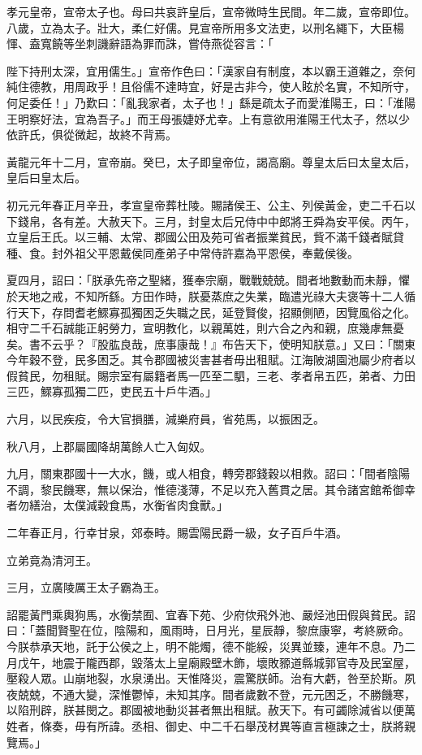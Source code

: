 
\begin{pinyinscope}
孝元皇帝，宣帝太子也。母曰共哀許皇后，宣帝微時生民間。年二歲，宣帝即位。八歲，立為太子。壯大，柔仁好儒。見宣帝所用多文法吏，以刑名繩下，大臣楊惲、盍寬饒等坐刺譏辭語為罪而誅，嘗侍燕從容言：「

陛下持刑太深，宜用儒生。」宣帝作色曰：「漢家自有制度，本以霸王道雜之，奈何純住德教，用周政乎！且俗儒不達時宜，好是古非今，使人眩於名實，不知所守，何足委任！」乃歎曰：「亂我家者，太子也！」繇是疏太子而愛淮陽王，曰：「淮陽王明察好法，宜為吾子。」而王母張婕妤尤幸。上有意欲用淮陽王代太子，然以少依許氏，俱從微起，故終不背焉。

黃龍元年十二月，宣帝崩。癸巳，太子即皇帝位，謁高廟。尊皇太后曰太皇太后，皇后曰皇太后。

初元元年春正月辛丑，孝宣皇帝葬杜陵。賜諸侯王、公主、列侯黃金，吏二千石以下錢帛，各有差。大赦天下。三月，封皇太后兄侍中中郎將王舜為安平侯。丙午，立皇后王氏。以三輔、太常、郡國公田及苑可省者振業貧民，貲不滿千錢者賦貸種、食。封外祖父平恩戴侯同產弟子中常侍許嘉為平恩侯，奉戴侯後。

夏四月，詔曰：「朕承先帝之聖緒，獲奉宗廟，戰戰兢兢。間者地數動而未靜，懼於天地之戒，不知所繇。方田作時，朕憂蒸庶之失業，臨遣光祿大夫褒等十二人循行天下，存問耆老鰥寡孤獨困乏失職之民，延登賢俊，招顯側陋，因覽風俗之化。相守二千石誠能正躬勞力，宣明教化，以親萬姓，則六合之內和親，庶幾虖無憂矣。書不云乎？『股肱良哉，庶事康哉！』布告天下，使明知朕意。」又曰：「關東今年穀不登，民多困乏。其令郡國被災害甚者毋出租賦。江海陂湖園池屬少府者以假貧民，勿租賦。賜宗室有屬籍者馬一匹至二駟，三老、孝者帛五匹，弟者、力田三匹，鰥寡孤獨二匹，吏民五十戶牛酒。」

六月，以民疾疫，令大官損膳，減樂府員，省苑馬，以振困乏。

秋八月，上郡屬國降胡萬餘人亡入匈奴。

九月，關東郡國十一大水，饑，或人相食，轉旁郡錢穀以相救。詔曰：「間者陰陽不調，黎民饑寒，無以保治，惟德淺薄，不足以充入舊貫之居。其令諸宮館希御幸者勿繕治，太僕減穀食馬，水衡省肉食獸。」

二年春正月，行幸甘泉，郊泰畤。賜雲陽民爵一級，女子百戶牛酒。

立弟竟為清河王。

三月，立廣陵厲王太子霸為王。

詔罷黃門乘輿狗馬，水衡禁囿、宜春下苑、少府佽飛外池、嚴烃池田假與貧民。詔曰：「蓋聞賢聖在位，陰陽和，風雨時，日月光，星辰靜，黎庶康寧，考終厥命。今朕恭承天地，託于公侯之上，明不能燭，德不能綏，災異並臻，連年不息。乃二月戊午，地震于隴西郡，毀落太上皇廟殿壁木飾，壞敗豲道縣城郭官寺及民室屋，壓殺人眾。山崩地裂，水泉湧出。天惟降災，震驚朕師。治有大虧，咎至於斯。夙夜兢兢，不通大變，深惟鬱悼，未知其序。間者歲數不登，元元困乏，不勝饑寒，以陷刑辟，朕甚閔之。郡國被地動災甚者無出租賦。赦天下。有可蠲除減省以便萬姓者，條奏，毋有所諱。丞相、御史、中二千石舉茂材異等直言極諫之士，朕將親覽焉。」


\end{pinyinscope}
